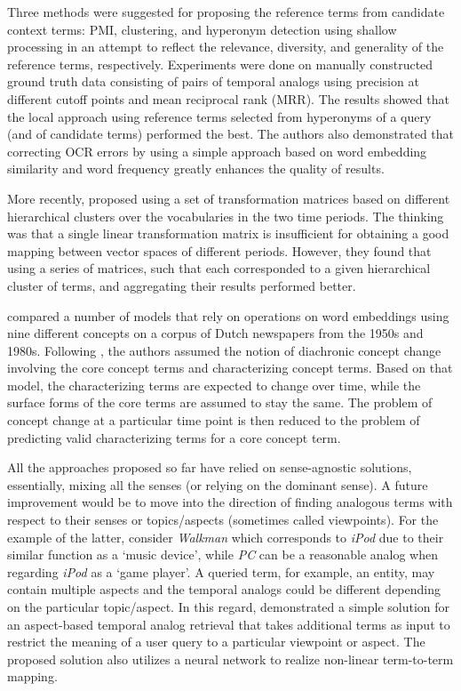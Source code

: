 \documentclass[output=paper]{langsci/langscibook}
\begin{document}
Three methods were suggested for proposing the reference terms from candidate context terms: PMI, clustering, and hyperonym detection using shallow processing \citep{ohshima2010high} in an attempt to reflect the relevance, diversity, and generality of the reference terms, respectively.
Experiments were done on manually constructed ground truth data consisting of pairs of temporal analogs using precision at different cutoff points and mean reciprocal rank (MRR). The results showed that the local approach using reference terms selected from hyperonyms of a query (and of candidate terms) performed the best. The authors also demonstrated that correcting OCR errors by using a simple approach based on word embedding similarity and word frequency greatly enhances the quality of results. 

More recently, \citet{zhang:2017:tar:3132847.3132917} proposed using a set of transformation matrices based on different hierarchical clusters over the vocabularies in the two time periods. The thinking was that a single linear transformation matrix is insufficient for obtaining a good mapping between vector spaces of different periods. However, they found that using a series of matrices, such that each corresponded to a given hierarchical cluster of terms, and aggregating their results performed better.

\citet{orlikowski-etal-2018-learning} compared a number of models that rely on operations on word embeddings using nine different concepts on a corpus of Dutch newspapers from the 1950s and 1980s.
Following \citet{kenter2015ad}, the authors assumed the notion of diachronic concept change involving the core concept terms and characterizing concept terms. Based on that model, the characterizing terms are expected to change over time, while the surface forms of the core terms are assumed to stay the same. The problem of concept change at a particular time point is then reduced to the problem of predicting valid characterizing terms for a core concept term.

All the approaches proposed so far have relied on sense-agnostic solutions, essentially, mixing all the senses (or relying on the dominant sense). A future improvement would be to move into the direction of finding analogous terms with respect to their senses or topics/aspects (sometimes called viewpoints). For the example of the latter, consider \emph{Walkman} which corresponds to \emph{iPod} due to their similar function as a `music device', while \emph{PC} can be a reasonable analog when regarding \emph{iPod} as a `game player'. A queried term, for example, an entity, may contain multiple aspects and the temporal analogs could be different depending on the particular topic/aspect. In this regard, \citet{zhangwsdm} demonstrated a simple solution for an aspect-based temporal analog retrieval that takes additional terms as input to restrict the meaning of a user query to a particular viewpoint or aspect. The proposed solution also utilizes a neural network to realize non-linear term-to-term mapping. 
\end{document}
